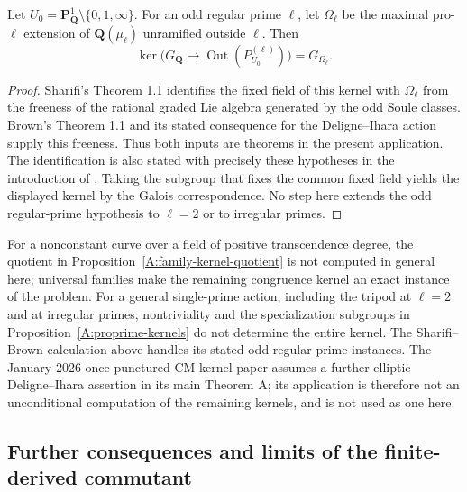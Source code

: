 \begin{proposition}
\label{A:regular-prime-kernel}
Let $U_0=\mathbf P^1_{\mathbf Q}\setminus\{0,1,\infty\}$.
For an odd regular prime $\ell$, let $\Omega_\ell$ be the
maximal pro-$\ell$ extension of $\mathbf Q(\mu_\ell)$
unramified outside $\ell$. Then
\[
 \ker\bigl(G_{\mathbf Q}\to
          \operatorname{Out}(P_{U_0}^{(\ell)})\bigr)
                   =G_{\Omega_\ell}.
\]
\end{proposition}
\begin{proof}
Sharifi's Theorem 1.1 \cite{A_Sharifi2002} identifies the
fixed field of this kernel with $\Omega_\ell$ from the
freeness of the rational graded Lie algebra generated by
the odd Soule classes. Brown's Theorem 1.1 and its stated
consequence for the Deligne--Ihara action
\cite{A_Brown2012} supply this freeness. Thus both inputs
are theorems in the present application. The identification
is also stated with precisely these hypotheses in the
introduction of \cite{A_IshiiKernels2026}. Taking the subgroup
that fixes the common fixed field yields the displayed kernel
by the Galois correspondence. No step here extends the odd
regular-prime hypothesis to $\ell=2$ or to irregular primes.
\end{proof}

\begin{remark}
\label{A:kernel-open}
For a nonconstant curve over a field of positive
transcendence degree, the quotient in
Proposition~\ref{A:family-kernel-quotient} is not computed
in general here; universal families make the remaining
congruence kernel an exact instance of the problem. For a
general single-prime action, including the tripod at
$\ell=2$ and at irregular primes, nontriviality and the
specialization subgroups in Proposition~\ref{A:proprime-kernels}
do not determine the entire kernel. The Sharifi--Brown
calculation above handles its stated odd regular-prime
instances. The January 2026 once-punctured CM kernel paper
\cite{A_IshiiKernels2026} assumes a further elliptic
Deligne--Ihara assertion in its main Theorem A; its
application is therefore not an unconditional computation
of the remaining kernels, and is not used as one here.
\end{remark}

\subsection{Further consequences and limits of the finite-derived commutant}

